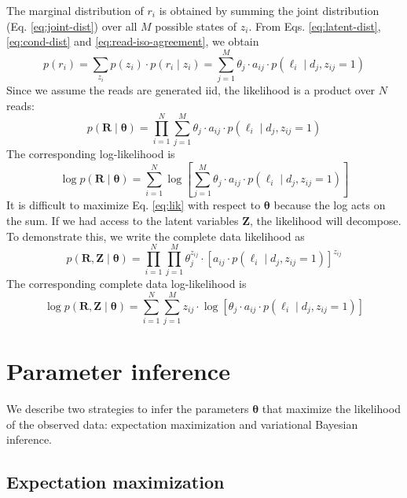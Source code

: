 The marginal distribution of $r_i$ is obtained by summing the joint distribution (Eq. \ref{eq:joint-dist}) over all $M$ possible states of $z_i$. From Eqs. \ref{eq:latent-dist}, \ref{eq:cond-dist} and \ref{eq:read-iso-agreement}, we obtain
\begin{equation}
    p(r_i)=\sum_{z_i}p(z_i)\cdot p(r_i\mid z_i)=\sum_{j=1}^M \theta_j\cdot a_{ij}\cdot p(\ell_i\mid d_j, z_{ij}=1)
\end{equation}
Since we assume the reads are generated iid, the likelihood is a product over $N$ reads:
\begin{equation}
    p(\bm{R}\mid\bm{\theta}) = \prod_{i=1}^N \sum_{j=1}^M \theta_j\cdot a_{ij}\cdot p(\ell_i\mid d_j, z_{ij}=1)\label{eq:lik}
\end{equation}
The corresponding log-likelihood is 
\begin{equation}
    \log p(\bm{R}\mid\bm{\theta}) = \sum_{i=1}^N \log \left[\sum_{j=1}^M \theta_j\cdot a_{ij}\cdot p(\ell_i\mid d_j, z_{ij}=1)\right]\label{eq:log-lik}
\end{equation}
It is difficult to maximize Eq. \ref{eq:lik} with respect to $\bm{\theta}$ because the log acts on the sum. If we had access to the latent variables $\bm{Z}$, the likelihood will decompose. To demonstrate this, we write the complete data likelihood as
\begin{equation}
    p(\bm{R},\bm{Z}\mid\bm{\theta})=\prod_{i=1}^N\prod_{j=1}^M \theta_j^{z_{ij}}\cdot\left[a_{ij}\cdot p(\ell_i\mid d_j, z_{ij}=1)\right]^{z_{ij}}\label{eq:comp-lik}
\end{equation}
The corresponding complete data log-likelihood is 
\begin{equation}
    \log p(\bm{R},\bm{Z}\mid\bm{\theta})=\sum_{i=1}^N\sum_{j=1}^M z_{ij}\cdot\log \left[\theta_j\cdot a_{ij}\cdot p(\ell_i\mid d_j, z_{ij}=1)\right]\label{eq:comp-log-lik}
\end{equation}

\section{Parameter inference}

We describe two strategies to infer the parameters $\bm{\theta}$ that maximize the likelihood of the observed data: expectation maximization and variational Bayesian inference.  

\subsection{Expectation maximization}\label{sec:em}

